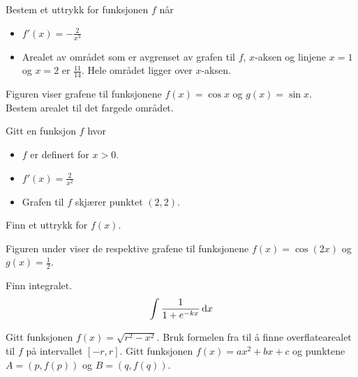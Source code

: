 Bestem et uttrykk for funksjonen $f$ når
\begin{itemize}
	\item $f'(x)=-\frac{2}{x^3}$
	\item Arealet av området som er avgrenset av grafen til $f$, $x$-aksen og linjene $x=1$ og $x=2$ er $\frac{11}{14}$. Hele området ligger over $x$-aksen.
\end{itemize}


Figuren viser grafene til funksjonene $ f(x)=\cos x$ og $ g(x)=\sin x $. \\
Bestem arealet til det fargede området.

 \vs
{}

Gitt en funksjon $f$ hvor
\begin{itemize}
	\item $f$ er definert for $x>0$.
	\item $f'(x)=\frac{2}{x^2}$
	\item Grafen til $f$ skjærer punktet $(2, 2)$.
\end{itemize}
Finn et uttrykk for $f(x)$.

Figuren under viser de respektive grafene til funksjonene $f(x) = \cos(2x)$ og $g(x)=\frac{1}{2}$.


Finn integralet.
\[\int \displaystyle \frac{1}{1+e^{-kx}}\,\text{d}x \]

Gitt funksjonen $f(x)=\sqrt{r^2-x^2}$.
Bruk formelen fra  til å finne overflatearealet til $f$ på intervallet $[-r, r]$.
\newpage
{}
Gitt funksjonen $f(x)=a x^2+b x + c$ og punktene $A=(p, f(p))$ og $B=(q, f(q))$.
 \vsb \vs
{} \vs

